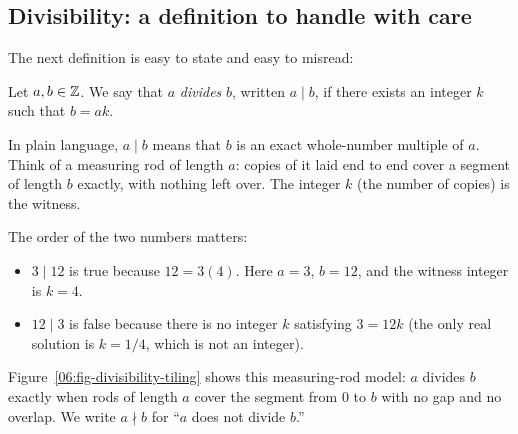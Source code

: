 \subsection{Divisibility: a definition to handle with care}

The next definition is easy to state and easy to misread:

\begin{definition}
Let $a, b \in \mathbb{Z}$. We say that $a$ \emph{divides} $b$, written $a \mid b$, if there exists an integer $k$ such that $b = ak$.
\end{definition}

In plain language, $a \mid b$ means that $b$ is an exact whole-number multiple of $a$. Think of a measuring rod of length $a$: copies of it laid end to end cover a segment of length $b$ exactly, with nothing left over. The integer $k$ (the number of copies) is the witness.

The order of the two numbers matters:
\begin{itemize}
\item $3 \mid 12$ is true because $12 = 3(4)$. Here $a = 3$, $b = 12$, and the witness integer is $k = 4$.
\item $12 \mid 3$ is false because there is no integer $k$ satisfying $3 = 12k$ (the only real solution is $k = 1/4$, which is not an integer).
\end{itemize}

Figure~\ref{06:fig-divisibility-tiling} shows this measuring-rod model: $a$ divides $b$ exactly when rods of length $a$ cover the segment from $0$ to $b$ with no gap and no overlap. We write $a \nmid b$ for ``$a$ does not divide $b$.''

